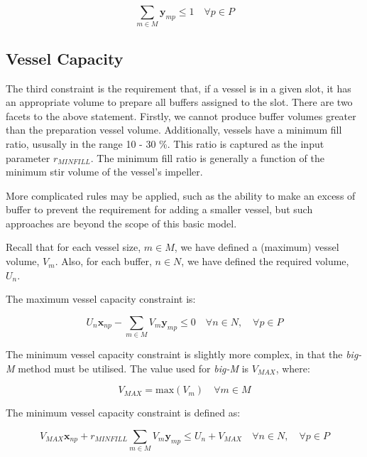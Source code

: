 \begin{equation}
    \sum_{m \in M} \boldsymbol{y}_{mp} \le 1 \quad \forall p \in P
\end{equation}

\subsection{Vessel Capacity}\label{SS.constr3}

The third constraint is the requirement that, if a vessel is in a given slot,
it has an appropriate volume to prepare all buffers assigned to the slot.
There are two facets to the above statement.  
Firstly, we cannot produce buffer volumes greater than the preparation vessel
volume.  
Additionally, vessels have a minimum fill ratio, ususally in the range 
10 - 30 \%.
This ratio is captured as the input parameter $r_{MINFILL}$.
The minimum fill ratio is generally a function of the minimum stir volume of 
the vessel's impeller.

More complicated rules may be applied, such as the ability to make an excess
of buffer to prevent the requirement for adding a smaller vessel, but such
approaches are beyond the scope of this basic model.

Recall that for each vessel size, $m \in M$, we have defined a (maximum) vessel
volume, $V_{m}$. Also, for each buffer, $n \in N$, we have defined the required
volume, $U_{n}$. 

The maximum vessel capacity constraint is:
        
\begin{equation}
    U_{n} \boldsymbol{x}_{np} - \sum_{m \in M} V_{m} \boldsymbol{y}_{mp} \le 0
    \quad \forall n \in N, \quad \forall p \in P
\end{equation}

The minimum vessel capacity constraint is slightly more complex, in that the
\emph{big-M} method must be utilised. The value used for \emph{big-M} is
$V_{MAX}$, where:

\begin{equation}
    V_{MAX} = \text{max} \left( V_{m} \right) \quad \forall m \in M
\end{equation}

The minimum vessel capacity constraint is defined as:

\begin{equation}
    V_{MAX} \boldsymbol{x}_{np} + r_{MINFILL} \sum_{m \in M} V_{m} 
    \boldsymbol{y}_{mp} \le U_{n} + V_{MAX} \quad \forall n \in N, \quad
    \forall p \in P
\end{equation}

